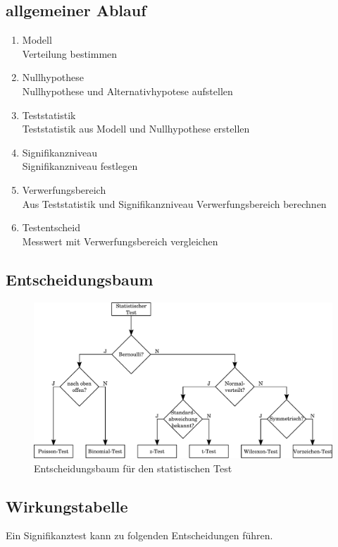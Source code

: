 \subsection{allgemeiner Ablauf}
\begin{enumerate}
  \item Modell \\
        Verteilung bestimmen
  \item Nullhypothese \\
        Nullhypothese und Alternativhypotese aufstellen
  \item Teststatistik \\
        Teststatistik aus Modell und Nullhypothese erstellen
  \item Signifikanzniveau \\
        Signifikanzniveau festlegen
  \item Verwerfungsbereich \\
        Aus Teststatistik und Signifikanzniveau Verwerfungsbereich berechnen
  \item Testentscheid \\
        Messwert mit Verwerfungsbereich vergleichen
\end{enumerate}

\subsection{Entscheidungsbaum}
\begin{figure}[h!]
  \centering
  \includegraphics[width=1\textwidth]{testauswahl.pdf}
  \caption{Entscheidungsbaum für den statistischen Test}
\end{figure}

\subsection{Wirkungstabelle}
Ein Signifikanztest kann zu folgenden Entscheidungen führen.

